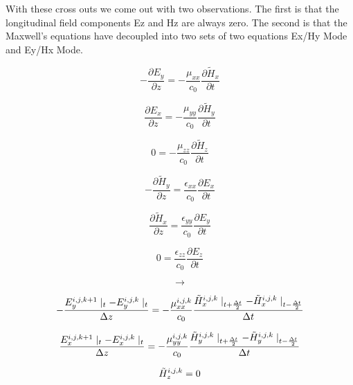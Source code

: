 \documentclass[a4paper,10pt]{article}
\begin{document}
With these cross outs we come out with two observations.  The first is that the longitudinal field components Ez and Hz are always zero.  The second is that the Maxwell's equations have decoupled into two sets of two equations Ex/Hy Mode and Ey/Hx Mode.

\begin{equation*}
  - \frac{\partial E_y}{\partial z} = -\frac{\mu_{xx}}{c_0}\frac{\partial\tilde{H}_x}{\partial t}
\end{equation*}

\begin{equation*}
  \frac{\partial E_x}{\partial z} = -\frac{\mu_{yy}}{c_0}\frac{\partial\tilde{H}_y}{\partial t}
\end{equation*}

\begin{equation*}
  0 = -\frac{\mu_{zz}}{c_0}\frac{\partial\tilde{H}_z}{\partial t}
\end{equation*}

\begin{equation*}
  - \frac{\partial \tilde{H}_y}{\partial z} = \frac{\epsilon_{xx}}{c_0}\frac{\partial E_x}{\partial t}
\end{equation*}

\begin{equation*}
  \frac{\partial \tilde{H}_x}{\partial z} = \frac{\epsilon_{yy}}{c_0}\frac{\partial E_y}{\partial t}
\end{equation*}

\begin{equation*}
  0 = \frac{\epsilon_{zz}}{c_0}\frac{\partial E_z}{\partial t}
\end{equation*}

\[\longrightarrow\]

\begin{equation*}
  - \frac{E_{y}^{i,j,k+1}\mid_{t} - E_{y}^{i,j,k}\mid_{t}}{\Delta z} = -\frac{\mu_{xx}^{i,j,k}}{c_0} \frac{\tilde{H}_{x}^{i,j,k}\mid_{t+\frac  {\Delta t}{2}} - \tilde{H}_{x}^{i,j,k}\mid_{t-\frac{\Delta t}{2}}}{\Delta t}\notag
\end{equation*}

\begin{equation*}
  \frac{E_{x}^{i,j,k+1}\mid_{t} - E_{x}^{i,j,k}\mid_{t}}{\Delta z} = -\frac{\mu_{yy}^{i,j,k}}{c_0} \frac{\tilde{H}_{y}^{i,j,k}\mid_{t+\frac  {\Delta t}{2}} - \tilde{H}_{y}^{i,j,k}\mid_{t-\frac{\Delta t}{2}}}{\Delta t}\notag
\end{equation*}

\begin{equation*}
  \tilde{H}_{z}^{i,j,k} = 0\notag
\end{equation*}
\end{document}
